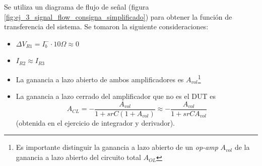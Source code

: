 \documentclass[../../main.tex]{subfiles}
\begin{document}
Se utiliza un diagrama de flujo de se\~nal (figura \ref{fig:ej_3_signal_flow_consigna_simplificado}) para obtener la funci\'on de transferencia del sistema. Se tomaron la siguiente consideraciones:

\begin{itemize} %
	\item $\Delta V_{R1} = I_b^- \cdot 10\Omega \approx 0$
	\item $I_{R2}\approx I_{R3}$
	\item La ganancia a lazo abierto de ambos amplificadores es $A_{vol}$\footnote{Es importante distinguir la ganancia a lazo abierto de un \textit{op-amp} $A_{vol}$ de la ganancia a lazo abierto del circuito total $A_{OL}$ }
	\item La ganancia a lazo cerrado del amplificador que no es el DUT es \[A_{CL} = -\frac{A_{vol}}{1+srC(1+A_{vol})} \approx -\frac{A_{vol}}{1+srCA_{vol}}\] (obtenida en el ejercicio de integrador y derivador).
\end{itemize}
\end{document}
